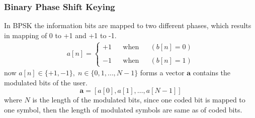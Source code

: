 \subsubsection{Binary Phase Shift Keying} 
In BPSK the information bits are mapped to two different phases, which results in mapping of 0 to +1 and +1 to -1.
\begin{eqnarray}
a[n]=\left \{
\begin{array}{lllll}
+1&& \mathrm{when}&& (b[n]=0) \\ \\
-1&& \mathrm{when}&& (b[n]=1) 
\end{array}
\right .
\end{eqnarray}
now $a[n]\in\{+1,-1\},\;n\in\{0,1,\dots,N-1\}$ forms a vector $\mathrm{\mathbf{a}}$ contains the modulated bits of the user.
\begin{equation}
\mathrm{\mathbf{a}} = [a[0],a[1],\dots,a[N-1]]
\end{equation}
where $N$ is the length of the modulated bits, since one coded bit is mapped to one symbol, then the length of modulated symbols are same as of coded bits.
